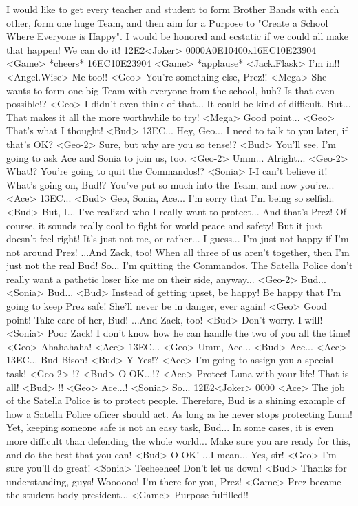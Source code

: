 I would like to get every teacher and student to form 
Brother Bands with each other, form one huge Team, 
and then aim for a Purpose to "Create a School Where Everyone is Happy". 
I would be honored and ecstatic if we could all make that happen! 
We can do it! 
{12}{E2}<Joker> {00}{00}{A0}{E1}{04}{00}x{16}{EC}{10}{E2}{39}{04} 
<Game> *cheers* 
{16}{EC}{10}{E2}{39}{04} 
<Game> *applause* 
<Jack.Flask> I'm in!! 
<Angel.Wise> Me too!! 
<Geo> You're something else, Prez!! 
<Mega> She wants to form one big Team with everyone from the school, huh? 
Is that even possible!? 
<Geo> I didn't even think of that... It could be kind of difficult. 
But... That makes it all the more worthwhile to try! 
<Mega> Good point... 
<Geo> That's what I thought! 
<Bud> {13}{EC}... 
Hey, Geo... 
I need to talk to you later, if that's OK? 
<Geo-2> Sure, but why are you so tense!? 
<Bud> You'll see. 
I'm going to ask Ace and Sonia to join us, too. 
<Geo-2> Umm... Alright... 
<Geo-2> What!? 
You're going to quit the Commandos!? 
<Sonia> I-I can't believe it! What's going on, Bud!? 
You've put so much into the Team, and now you're... 
<Ace> {13}{EC}... 
<Bud> Geo, Sonia, Ace... 
I'm sorry that I'm being so selfish. 
<Bud> But, I... I've realized who I really want to protect... 
And that's Prez! 
Of course, it sounds really cool to fight for world peace and safety! 
But it just doesn't feel right! 
It's just not me, or rather... 
I guess... I'm just not happy if I'm not around Prez! 
...And Zack, too! 
When all three of us aren't together, then I'm just not the real Bud! 
So... 
I'm quitting the Commandos. 
The Satella Police don't really want a pathetic loser like me on their side, anyway... 
<Geo-2> Bud... 
<Sonia> Bud... 
<Bud> Instead of getting upset, be happy! 
Be happy that I'm going to keep Prez safe! 
She'll never be in danger, ever again! 
<Geo> Good point! 
Take care of her, Bud! 
...And Zack, too! 
<Bud> Don't worry. I will! 
<Sonia> Poor Zack! 
I don't know how he can handle the two of you all the time! 
<Geo> Ahahahaha! 
<Ace> {13}{EC}... 
<Geo> Umm, Ace... 
<Bud> Ace... 
<Ace> {13}{EC}... 
Bud Bison! 
<Bud> Y-Yes!? 
<Ace> I'm going to assign you a special task! 
<Geo-2> !? 
<Bud> O-OK...!? 
<Ace> Protect Luna with your life! 
That is all! 
<Bud> !! 
<Geo> Ace...! 
<Sonia> So... 
{12}{E2}<Joker> {00}{00} 
<Ace> The job of the Satella Police is to protect people. 
Therefore, Bud is a shining example of how a Satella Police officer should act. 
As long as he never stops protecting Luna! 
Yet, keeping someone safe is not an easy task, Bud... 
In some cases, it is even more difficult than defending the whole world... 
Make sure you are ready for this, and do the best that you can! 
<Bud> O-OK! 
...I mean... Yes, sir! 
<Geo> I'm sure you'll do great! 
<Sonia> Teeheehee! Don't let us down! 
<Bud> Thanks for understanding, guys! Woooooo! 
I'm there for you, Prez! 
<Game> Prez became the student body president... 
<Game> Purpose fulfilled!! 
